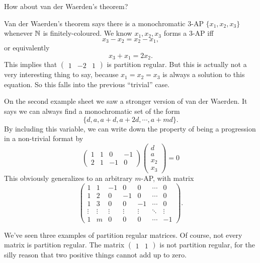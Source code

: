 \documentclass[a4paper]{article}
\begin{document}
  How about van der Waerden's theorem?
  \begin{eg}
    Van der Waerden's theorem says there is a monochromatic $3$-AP $\{x_1, x_2, x_3\}$ whenever $\mathbb{N}$ is finitely-coloured. We know $x_1, x_2, x_3$ forms a $3$-AP iff
    \[
      x_3 - x_2 = x_2 - x_1,
    \]
    or equivalently
    \[
      x_3 + x_1 = 2 x_2.
    \]
    This implies that $\begin{pmatrix}1 & -2 & 1\end{pmatrix}$ is partition regular. But this is actually not a very interesting thing to say, because $x_1 = x_2 = x_3$ is always a solution to this equation. So this falls into the previous ``trivial'' case.

    On the second example sheet we saw a stronger version of van der Waerden. It says we can always find a monochromatic set of the form
    \[
      \{d, a, a + d, a + 2d, \cdots, a + md\}.
    \]
    By including this variable, we can write down the property of being a progression in a non-trivial format by
    \[
      \begin{pmatrix}
        1 & 1 & 0 & -1\\
        2 & 1 & -1 & 0
      \end{pmatrix}
      \begin{pmatrix}
        d \\ a \\ x_2 \\ x_3
      \end{pmatrix} = 0
    \]
    This obviously generalizes to an arbitrary $m$-AP, with matrix
    \[
      \begin{pmatrix}
        1 & 1 & -1 & 0 & 0 & \cdots & 0\\
        1 & 2 & 0 & -1 & 0 & \cdots & 0\\
        1 & 3 & 0 & 0 & -1 & \cdots & 0\\
        \vdots & \vdots & \vdots & \vdots & \vdots & \ddots & \vdots\\
        1 & m & 0 & 0 & 0 & \cdots & -1
      \end{pmatrix}.
    \]
  \end{eg}
  We've seen three examples of partition regular matrices. Of course, not every matrix is partition regular. The matrix $\begin{pmatrix}1 & 1\end{pmatrix}$ is not partition regular, for the silly reason that two positive things cannot add up to zero.
\end{document}

